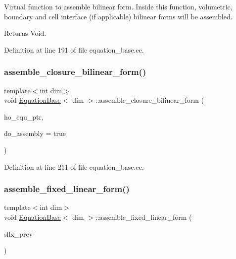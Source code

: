 Virtual function to assemble bilinear form. Inside this function, volumetric, boundary and cell interface (if applicable) bilinear forms will be assembled.

\begin{DoxyReturn}{Returns}
Void. 
\end{DoxyReturn}


Definition at line 191 of file equation\+\_\+base.\+cc.

\mbox{\label{class_equation_base_a44faf34fc306d85f5e84e9c16bea985d}} 
\subsubsection{\texorpdfstring{assemble\+\_\+closure\+\_\+bilinear\+\_\+form()}{assemble\_closure\_bilinear\_form()}}
{\footnotesize\ttfamily template$<$int dim$>$ \\
void \hyperlink{class_equation_base}{Equation\+Base}$<$ dim $>$\+::assemble\+\_\+closure\+\_\+bilinear\+\_\+form (\begin{DoxyParamCaption}\item[{std\+\_\+cxx11\+::shared\+\_\+ptr$<$ \hyperlink{class_equation_base}{Equation\+Base}$<$ dim $>$ $>$}]{ho\+\_\+equ\+\_\+ptr,  }\item[{bool}]{do\+\_\+assembly = {\ttfamily true} }\end{DoxyParamCaption})}



Definition at line 211 of file equation\+\_\+base.\+cc.

\mbox{\label{class_equation_base_aa6a5d3dd752c1e2389b329c141c44ee7}} 
\subsubsection{\texorpdfstring{assemble\+\_\+fixed\+\_\+linear\+\_\+form()}{assemble\_fixed\_linear\_form()}}
{\footnotesize\ttfamily template$<$int dim$>$ \\
void \hyperlink{class_equation_base}{Equation\+Base}$<$ dim $>$\+::assemble\+\_\+fixed\+\_\+linear\+\_\+form (\begin{DoxyParamCaption}\item[{std\+::vector$<$ Vector$<$ double $>$ $>$ \&}]{sflx\+\_\+prev }\end{DoxyParamCaption})\hspace{0.3cm}{\ttfamily [virtual]}}



